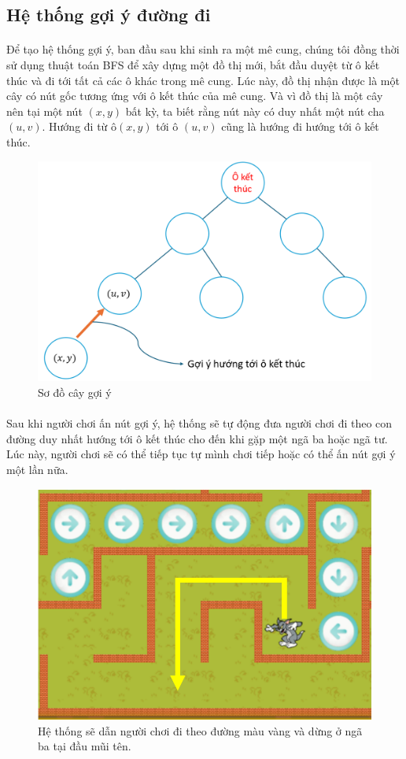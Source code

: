 \subsection{Hệ thống gợi ý đường đi}

\paragraph{}{Để tạo hệ thống gợi ý, ban đầu sau khi sinh ra một mê cung, chúng tôi đồng thời sử dụng thuật toán BFS để xây dựng một đồ thị mới, bắt đầu duyệt từ ô kết thúc và đi tới tất cả các ô khác trong mê cung. Lúc này, đồ thị nhận được là một cây có nút gốc tương ứng với ô kết thúc của mê cung. Và vì đồ thị là một cây nên tại một nút $(x, y)$ bất kỳ, ta biết rằng nút này có duy nhất một nút cha $(u, v)$. Hướng đi từ  ô$(x, y)$ tới ô $(u, v)$ cũng là hướng đi hướng tới ô kết thúc. }

\begin{figure}[H]
    \centering
    \includegraphics[width=0.7\linewidth]{img/hint_line_1.png}
    \caption{Sơ đồ cây gợi ý}
    \label{fig:hint_line_1}
\end{figure}

\paragraph{}{Sau khi người chơi ấn nút gợi ý, hệ thống sẽ tự động đưa người chơi đi theo con đường duy nhất hướng tới ô kết thúc cho đến khi gặp một ngã ba hoặc ngã tư. Lúc này, người chơi sẽ có thể tiếp tục tự mình chơi tiếp hoặc có thể ấn nút gợi ý một lần nữa.}

\begin{figure}[H]
    \centering
    \includegraphics[width=0.7\linewidth]{img/hint_line_2.png}
    \caption{Hệ thống sẽ dẫn người chơi đi theo đường màu vàng và dừng ở ngã ba tại đầu mũi tên.}
    \label{fig:hint_line_2}
\end{figure}